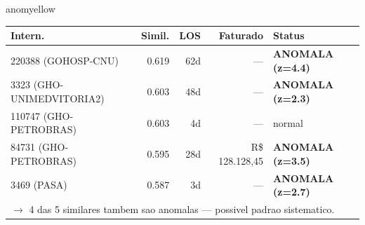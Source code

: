\documentclass[a4paper,10pt]{article}
\begin{document}
\begin{anomalycard}[Internacao 166636 | GHO-PETROBRAS | MODERADO (z=2.09)]{anomyellow}
\begin{tabular}{l r r r l}\toprule\textbf{Intern.} & \textbf{Simil.} & \textbf{LOS} & \textbf{Faturado} & \textbf{Status} \\\midrule
220388 (GOHOSP-CNU) & 0.619 & 62d & --- & \textcolor{anomred}{\textbf{ANOMALA (z=4.4)}} \\
3323 (GHO-UNIMEDVITORIA2) & 0.603 & 48d & --- & \textcolor{anomred}{\textbf{ANOMALA (z=2.3)}} \\
110747 (GHO-PETROBRAS) & 0.603 & 4d & --- & \textcolor{jcubeblue}{normal} \\
84731 (GHO-PETROBRAS) & 0.595 & 28d & R\$ 128.128,45 & \textcolor{anomred}{\textbf{ANOMALA (z=3.5)}} \\
3469 (PASA) & 0.587 & 3d & --- & \textcolor{anomred}{\textbf{ANOMALA (z=2.7)}} \\
\multicolumn{5}{l}{\textcolor{anomred}{\small $\rightarrow$ 4 das 5 similares tambem sao anomalas --- possivel padrao sistematico.}} \\
\bottomrule\end{tabular}


\end{anomalycard}

\newpage
\end{document}
